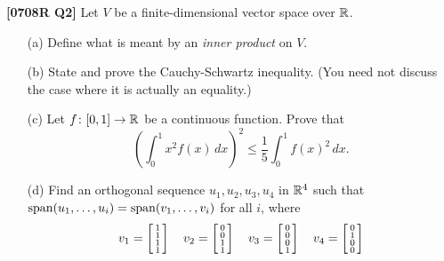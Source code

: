 \documentclass[a4paper]{article}
\begin{document}
\begin{problem}\textbf{[0708R Q2]}
 Let $V$ be a finite-dimensional vector space over ${\mathbb{R}}$.
 \begin{itemize}
  \item[(a)] Define what is meant by an \emph{inner product}
   on $V$. 
  \item[(b)] State and prove the Cauchy-Schwartz inequality.
   (You need not discuss the case where it is actually an
   equality.) 
  \item[(c)] Let $f\colon[0,1]\to{\mathbb{R}}$ be a continuous function.
   Prove that 
   \[ \left(\textstyle \int_0^1 x^2 f(x)\,dx\right)^2 
       \leq \frac{1}{5}\int_0^1 f(x)^2\,dx.
   \]
  \item[(d)] Find an orthogonal sequence $u_1,u_2,u_3,u_4$
   in ${\mathbb{R}}^4$ such that
   $\operatorname{span}(u_1,\dotsc,u_i)=\operatorname{span}(v_1,\dotsc,v_i)$ for all $i$,
   where
   \[ v_1 = \left[\begin{smallmatrix} 1\\1\\1\\1\end{smallmatrix}\right] \hspace{1em}
      v_2 = \left[\begin{smallmatrix} 0\\0\\1\\1\end{smallmatrix}\right] \hspace{1em}
      v_3 = \left[\begin{smallmatrix} 0\\0\\0\\1\end{smallmatrix}\right] \hspace{1em}
      v_4 = \left[\begin{smallmatrix} 0\\1\\0\\0\end{smallmatrix}\right] 
   \]
 \end{itemize}
\end{problem}
\end{document}
